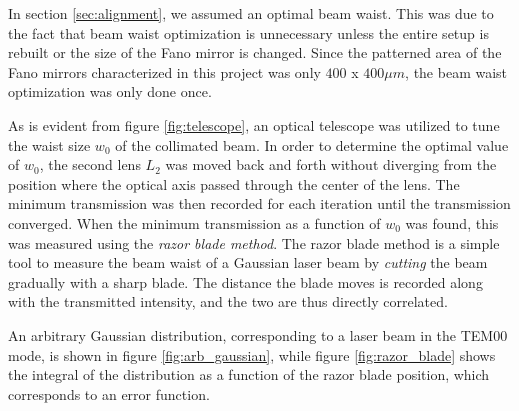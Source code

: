 In section \ref{sec:alignment}, we assumed an optimal beam waist. This was due to the fact that beam waist optimization is unnecessary unless the entire setup is rebuilt or the size of the Fano mirror is changed. Since the patterned area of the Fano mirrors characterized in this project was only $400$ x $400 \mu m$, the beam waist optimization was only done once.

As is evident from figure \ref{fig:telescope}, an optical telescope was utilized to tune the waist size $w_0$ of the collimated beam. In order to determine the optimal value of $w_0$, the second lens $L_2$ was moved back and forth without diverging from the position where the optical axis passed through the center of the lens. The minimum transmission was then recorded for each iteration until the transmission converged. When the minimum transmission as a function of $w_0$ was found, this was measured using the \emph{razor blade method}. The razor blade method is a simple tool to measure the beam waist of a Gaussian laser beam by \emph{cutting} the beam gradually with a sharp blade. The distance the blade moves is recorded along with the transmitted intensity, and the two are thus directly correlated\cite{Forster}.

An arbitrary Gaussian distribution, corresponding to a laser beam in the TEM00 mode, is shown in figure \ref{fig:arb_gaussian}, while figure \ref{fig:razor_blade} shows the integral of the distribution as a function of the razor blade position, which corresponds to an error function. 

